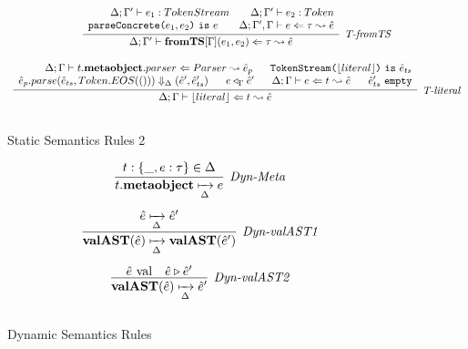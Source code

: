 \begin{figure}
\[\begin{array}{c}
\infer[\textit{T-fromTS}]
	  {\Delta; \Gamma' \vdash \keyw{fromTS}[\Gamma](e_1,e_2) \Leftarrow \tau \leadsto \hat{e} }
	  {\renewcommand{\arraystretch}{1}
	    \begin{array}{r}
	    \Delta;\Gamma' \vdash e_1:TokenStream ~~~~~~ \Delta;\Gamma' \vdash e_2:Token\\
            \texttt{parseConcrete(}e_1,e_2\texttt{)}\ \texttt{is}\ e ~~~~~~\Delta; \Gamma', \Gamma \vdash e \Leftarrow \tau \leadsto \hat{e}
            \end{array}
       } \\[3ex]  

\infer[\textit{T-literal}]
	  {\Delta; \Gamma \vdash \lfloor literal \rfloor \Leftarrow t \leadsto \hat{e} }
	  {\renewcommand{\arraystretch}{1}
	    \begin{array}{r}
	    \Delta;\Gamma \vdash t.\keyw{metaobject}.parser\Leftarrow Parser \leadsto \hat{e}_p ~~~~~ \texttt{TokenStream(}\lfloor literal \rfloor \texttt{)}\ \texttt{is}\ \hat{e}_{ts}\\
            \hat{e}_p.parse(\hat{e}_{ts}, Token.EOS(())) \Downarrow_{\Delta} (\hat{e}', \hat e_{ts}') ~~~~~  e \triangleleft_\Gamma \hat{e}'~~~~~ \Delta;\Gamma\vdash e\Leftarrow t \leadsto \hat{e} ~~~~~ \hat e_{ts}'\ \texttt{empty}
            \end{array}
       } \\[3ex]   
\end{array}
\]
\label{fig:statics2}
\caption{Static Semantics Rules 2}
\end{figure}

\begin{figure}
\centering
\[
\begin{array}{c}

\infer[\textit{Dyn-Meta}]
	{t.\keyw{metaobject} \xmapsto[\Delta]{} e} 
	{t:\{\_,e:\tau \} \in \Delta}\\[3ex]

\infer[\textit{Dyn-valAST1}]
	{\keyw{valAST}(\hat{e}) \xmapsto[\Delta]{} \keyw{valAST}(\hat{e}') } 
	{\hat{e} \xmapsto[\Delta]{} \hat{e}'}\\[3ex]

\infer[\textit{Dyn-valAST2}]
	{\keyw{valAST}(\hat{e}) \xmapsto[\Delta]{} \hat{e}' } 
	{\hat{e}\ \text{val} &\hat{e} \triangleright \hat{e}' }\\[3ex]




\end{array}
\]
\caption{Dynamic Semantics Rules}
\end{figure}




